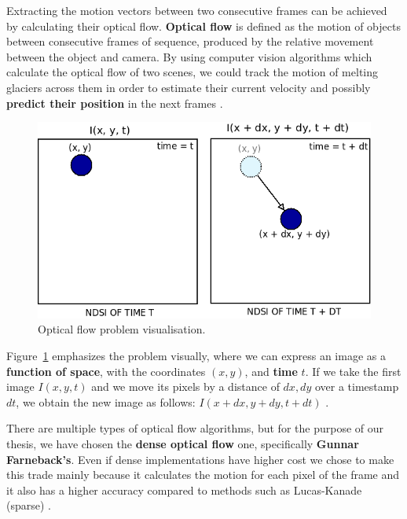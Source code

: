 \documentclass[12pt, a4paper]{report}
\begin{document}
	\par Extracting the motion vectors between two consecutive frames can be achieved by calculating their optical flow. \textbf{Optical flow} is defined as the motion of objects between consecutive frames of sequence, produced by the relative movement between the object and camera. By using computer vision algorithms which calculate the optical flow of two scenes, we could track the motion of melting glaciers across them in order to estimate their current velocity and possibly \textbf{predict their position} in the next frames \cite{opticalflow}.
	
	\begin{figure}[h]
		\centering
		\includegraphics[scale=0.6]{../images/optical_flow_schema.png}
		\caption{Optical flow problem visualisation.}
		\label{fig:optical_flow_example}
	\end{figure}
	
	\par Figure~\ref{fig:optical_flow_example} emphasizes the problem visually, where we can express an image as a \textbf{function of space}, with the coordinates \textbf{\((x, y)\)}, and \textbf{time} \textbf{\(t\)}. If we take the first image\textbf{ \(I(x, y, t)\)} and we move its pixels by a distance of \textbf{\(dx, dy\)} over a timestamp \textbf{\(dt\)}, we obtain the new image as follows: \textbf{\(I(x + dx, y + dy, t + dt)\)} \cite{orb}.
	
	\par There are multiple types of optical flow algorithms, but for the purpose of our thesis, we have chosen the \textbf{dense optical flow} one, specifically \textbf{Gunnar Farneback's}. Even if dense implementations have higher cost we chose to make this trade mainly because it calculates the motion for each pixel of the frame and it also has a higher accuracy \cite{orb} compared to methods such as Lucas-Kanade (sparse) \cite{lukas}.
	
\end{document}

